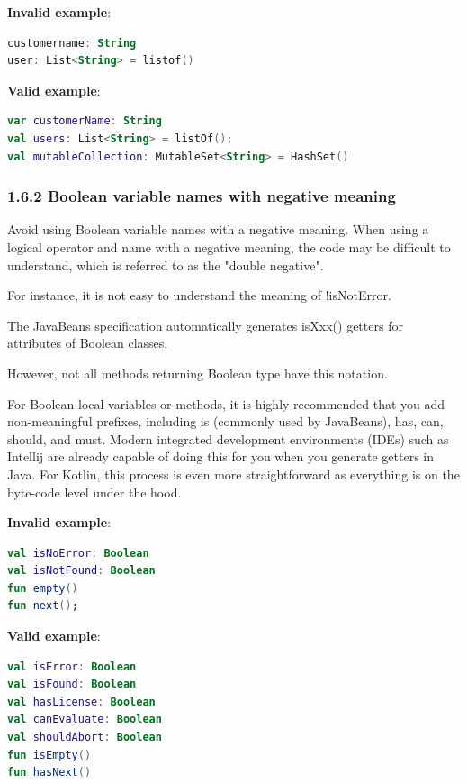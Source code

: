 \textbf{Invalid example}: 

\begin{lstlisting}[language=Kotlin]
customername: String
user: List<String> = listof()
\end{lstlisting}


\textbf{Valid example}: 

\begin{lstlisting}[language=Kotlin]
var customerName: String
val users: List<String> = listOf();
val mutableCollection: MutableSet<String> = HashSet()
\end{lstlisting}


\subsubsection*{\textbf{1.6.2 Boolean variable names with negative meaning}}
\leavevmode\newline



Avoid using Boolean variable names with a negative meaning. When using a logical operator and name with a negative meaning, the code may be difficult to understand, which is referred to as the "double negative".

For instance, it is not easy to understand the meaning of !isNotError.

The JavaBeans specification automatically generates isXxx() getters for attributes of Boolean classes.

However, not all methods returning Boolean type have this notation.

For Boolean local variables or methods, it is highly recommended that you add non-meaningful prefixes, including is (commonly used by JavaBeans), has, can, should, and must. Modern integrated development environments (IDEs) such as Intellij are already capable of doing this for you when you generate getters in Java. For Kotlin, this process is even more straightforward as everything is on the byte-code level under the hood.



\textbf{Invalid example}: 

\begin{lstlisting}[language=Kotlin]
val isNoError: Boolean
val isNotFound: Boolean
fun empty()
fun next();
\end{lstlisting}


\textbf{Valid example}:

\begin{lstlisting}[language=Kotlin]
val isError: Boolean
val isFound: Boolean
val hasLicense: Boolean
val canEvaluate: Boolean
val shouldAbort: Boolean
fun isEmpty()
fun hasNext()
\end{lstlisting}
